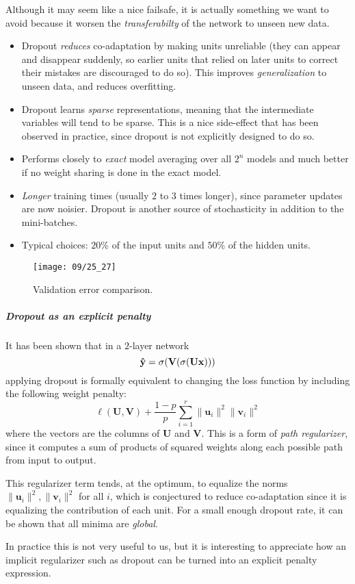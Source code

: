 Although it may seem like a nice failsafe, it is actually something we want to avoid because it worsen the \emph{transferabilty} of the network to unseen new data.
\begin{itemize}
    \item Dropout \emph{reduces} co-adaptation by making units unreliable (they can appear and disappear suddenly, so earlier units that relied on later units to correct their mistakes are discouraged to do so). 
    This improves \emph{generalization} to unseen data, and reduces overfitting.
    
    \item Dropout learns \emph{sparse} representations, meaning that the intermediate variables will tend to be sparse. This is a nice side-effect that has been observed in practice, since dropout is not explicitly designed to do so.
    
    \item Performs closely to \emph{exact} model averaging over all $2^n$ models 
    and much better if no weight sharing is done in the exact model.
    
    \item \emph{Longer} training times (usually $2$ to $3$ times longer), since parameter updates are now noisier.
    Dropout is another source of stochasticity in addition to the mini-batches.
    
    \item Typical choices: $20$\% of the input units and $50$\% of the hidden units.
\end{itemize}

\begin{figure}[H]
    \centering
    \texttt{[image: 09/25\_27]}
    \caption{Validation error comparison.}	
\end{figure}

\subparagraph{Dropout as an explicit penalty}

It has been shown that in a $2$-layer network 
\begin{equation}
    \vb{\hat{y}} = \sigma(\vb{V}(\sigma(\vb{U} \vb{x})))
\end{equation}
applying dropout is formally equivalent to changing the loss function by including the following weight penalty:
\begin{equation}
    \ell(\mathbf{U},\mathbf{V}) + \frac{1-p}{p} \sum_{i=1}^r \| \mathbf{u}_i\|^2 \| \mathbf{v}_i\|^2
\end{equation}
where the vectors are the columns of $\mathbf{U}$ and $\mathbf{V}$. This is a form of \emph{path regularizer}, since it computes a sum of products of squared weights along each possible path from input to output. 

This regularizer term tends, at the optimum, to equalize the norms $\| \mathbf{u}_i\|^2,\| \mathbf{v}_i\|^2$ for all $i$, which is conjectured to reduce co-adaptation since it is equalizing the contribution of each unit. For a small enough dropout rate, it can be shown that all minima are \emph{global}.

In practice this is not very useful to us, but it is interesting to appreciate how an implicit regularizer such as dropout can be turned into an explicit penalty expression.